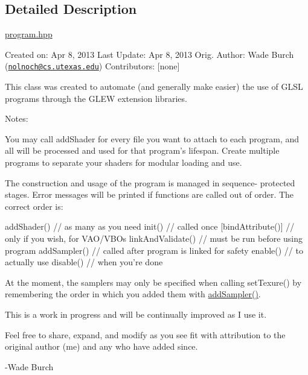 \subsection{Detailed Description}
\hyperlink{program_8hpp_source}{program.\-hpp}

Created on\-: Apr 8, 2013 Last Update\-: Apr 8, 2013 Orig. Author\-: Wade Burch (\href{mailto:nolnoch@cs.utexas.edu}{\tt nolnoch@cs.\-utexas.\-edu}) Contributors\-: \mbox{[}none\mbox{]}

This class was created to automate (and generally make easier) the use of G\-L\-S\-L programs through the G\-L\-E\-W extension libraries.

Notes\-:

You may call add\-Shader for every file you want to attach to each program, and all will be processed and used for that program's lifespan. Create multiple programs to separate your shaders for modular loading and use.

The construction and usage of the program is managed in sequence-\/ protected stages. Error messages will be printed if functions are called out of order. The correct order is\-: \begin{DoxyVerb}  addShader()         // as many as you need
  init()              // called once
  [bindAttribute()]   // only if you wish, for VAO/VBOs
  linkAndValidate()   // must be run before using program
  addSampler()        // called after program is linked for safety
  enable()            // to actually use
  disable()           // when you're done
\end{DoxyVerb}


At the moment, the samplers may only be specified when calling set\-Texure() by remembering the order in which you added them with \hyperlink{classProgram_aa0fe912ec4d03063c3e15b383ae8c113}{add\-Sampler()}.

This is a work in progress and will be continually improved as I use it.

Feel free to share, expand, and modify as you see fit with attribution to the original author (me) and any who have added since.

-\/\-Wade Burch 

